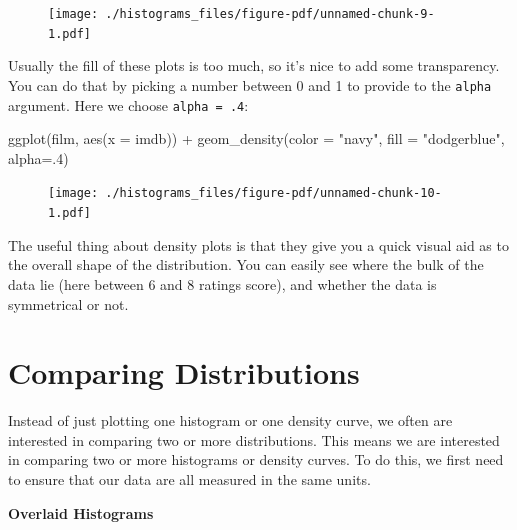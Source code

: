 \documentclass[
  letterpaper,
  DIV=11,
  numbers=noendperiod]{scrreprt}
\newenvironment{Shaded}{\begin{snugshade}}{\end{snugshade}}
\newcommand{\AttributeTok}[1]{\textcolor[rgb]{0.40,0.45,0.13}{#1}}
\newcommand{\DecValTok}[1]{\textcolor[rgb]{0.68,0.00,0.00}{#1}}
\newcommand{\FunctionTok}[1]{\textcolor[rgb]{0.28,0.35,0.67}{#1}}
\newcommand{\NormalTok}[1]{\textcolor[rgb]{0.00,0.23,0.31}{#1}}
\newcommand{\SpecialCharTok}[1]{\textcolor[rgb]{0.37,0.37,0.37}{#1}}
\newcommand{\StringTok}[1]{\textcolor[rgb]{0.13,0.47,0.30}{#1}}
\begin{document}
\begin{figure}[H]

{\centering \texttt{[image: ./histograms\_files/figure-pdf/unnamed-chunk-9-1.pdf]}

}

\end{figure}

Usually the fill of these plots is too much, so it's nice to add some
transparency. You can do that by picking a number between 0 and 1 to
provide to the \texttt{alpha} argument. Here we choose
\texttt{alpha\ =\ .4}:

\begin{Shaded}
\begin{Highlighting}[]
\FunctionTok{ggplot}\NormalTok{(film, }\FunctionTok{aes}\NormalTok{(}\AttributeTok{x =}\NormalTok{ imdb)) }\SpecialCharTok{+}  
  \FunctionTok{geom\_density}\NormalTok{(}\AttributeTok{color =} \StringTok{"navy"}\NormalTok{, }\AttributeTok{fill =} \StringTok{"dodgerblue"}\NormalTok{, }\AttributeTok{alpha=}\NormalTok{.}\DecValTok{4}\NormalTok{)}
\end{Highlighting}
\end{Shaded}

\begin{figure}[H]

{\centering \texttt{[image: ./histograms\_files/figure-pdf/unnamed-chunk-10-1.pdf]}

}

\end{figure}

The useful thing about density plots is that they give you a quick
visual aid as to the overall shape of the distribution. You can easily
see where the bulk of the data lie (here between 6 and 8 ratings score),
and whether the data is symmetrical or not.

\hypertarget{comparing-distributions}{%
\section{Comparing Distributions}\label{comparing-distributions}}

Instead of just plotting one histogram or one density curve, we often
are interested in comparing two or more distributions. This means we are
interested in comparing two or more histograms or density curves. To do
this, we first need to ensure that our data are all measured in the same
units.

\textbf{Overlaid Histograms}
\end{document}
